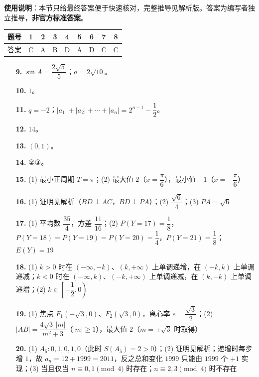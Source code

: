 
\begin{gknotice}
\textbf{使用说明}：本节只给最终答案便于快速核对，完整推导见解析版。答案为编写者独立推导，\textbf{非官方标准答案}。
\end{gknotice}

\begin{center}\begin{tabular}{ccccccccc}
\toprule
题号 & 1 & 2 & 3 & 4 & 5 & 6 & 7 & 8 \\
\midrule
答案 & C & A & B & D & A & D & C & C \\
\bottomrule
\end{tabular}\end{center}

\begin{itemize}[leftmargin=2.6em]
  \item[\textbf{9.}] $\sin A=\dfrac{2\sqrt5}{5}$；$a=2\sqrt{10}$。
  \item[\textbf{10.}] $1$。
  \item[\textbf{11.}] $q=-2$；$|a_1|+|a_2|+\cdots+|a_n|=2^{n-1}-\dfrac12$。
  \item[\textbf{12.}] $14$。
  \item[\textbf{13.}] $(0,1)$。
  \item[\textbf{14.}] ②③。
\end{itemize}

\begin{itemize}[leftmargin=2.6em]
  \item[\textbf{15.}] (1) 最小正周期 $T=\pi$；(2) 最大值 $2$（$x=\dfrac{\pi}{6}$），最小值 $-1$（$x=-\dfrac{\pi}{6}$）
  \item[\textbf{16.}] (1) 证明见解析（$BD\perp AC$，$BD\perp PA$）；(2) $\dfrac{\sqrt6}{4}$；(3) $PA=\sqrt6$
  \item[\textbf{17.}] (1) 平均数 $\dfrac{35}{4}$，方差 $\dfrac{11}{16}$；(2) $P(Y=17)=\dfrac18$，$P(Y=18)=P(Y=19)=P(Y=20)=\dfrac14$，$P(Y=21)=\dfrac18$；$E(Y)=19$
  \item[\textbf{18.}] (1) $k>0$ 时在 $(-\infty,-k)$、$(k,+\infty)$ 上单调递增，在 $(-k,k)$ 上单调递减；$k<0$ 时在 $(-\infty,k)$、$(-k,+\infty)$ 上单调递减，在 $(k,-k)$ 上单调递增；(2) $k\in\left[-\dfrac12,0\right)$
  \item[\textbf{19.}] (1) 焦点 $F_1(-\sqrt3,0)$、$F_2(\sqrt3,0)$，离心率 $e=\dfrac{\sqrt3}{2}$；(2) $|AB|=\dfrac{4\sqrt3\,|m|}{m^2+3}$（$|m|\geqslant1$），最大值 $2$（$m=\pm\sqrt3$ 时取得）
  \item[\textbf{20.}] (1) $A_5:0,1,0,1,0$（此时 $S(A_5)=2>0$）；(2) 证明见解析；递增时每步增 $1$，故 $a_n=12+1999=2011$，反之总和变化 $1999$ 只能由 $1999$ 个 $+1$ 实现；(3) 当且仅当 $n\equiv0,1\pmod 4$ 时存在；$n\equiv2,3\pmod 4$ 时不存在
\end{itemize}
